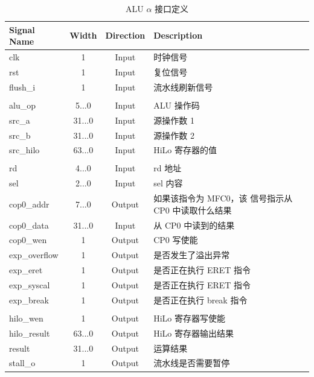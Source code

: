 \documentclass[blue,normal,cn,hide]{elegantbook}
\begin{document}
\begin{table}
    \renewcommand\arraystretch{1.25}
    \centering
    \begin{tabular}{lccm{}}
        \toprule 
        \rowcolor{black!20} \textbf{Signal Name} & \textbf{Width} & \textbf{Direction} & \textbf{Description} \\
        \midrule
        clk & 1 & Input & 时钟信号\\
        rst & 1 & Input & 复位信号\\
        flush\_i & 1 &Input & 流水线刷新信号\\
        \\
        alu\_op & 5...0 & Input & ALU 操作码\\
        src\_a & 31...0 & Input & 源操作数 1\\
        src\_b & 31...0 & Input & 源操作数 2\\
        src\_hilo & 63...0 & Input & HiLo 寄存器的值\\
        \\
        rd & 4...0 & Input & rd 地址\\
        sel & 2...0 & Input & sel 内容\\
        cop0\_addr & 7...0 & Output & 如果该指令为 MFC0，该
        信号指示从 CP0 中读取什么结果\\
        cop0\_data & 31...0 & Input & 从 CP0 中读到的结果\\
        cop0\_wen & 1 & Output & CP0 写使能\\
        exp\_overflow & 1 & Output & 是否发生了溢出异常\\
        exp\_eret & 1 & Output & 是否正在执行 ERET 指令\\
        exp\_syscal & 1 & Output & 是否正在执行 ERET 指令\\
        exp\_break & 1 & Output & 是否正在执行 break 指令\\
        \\
        hilo\_wen & 1 & Output & HiLo 寄存器写使能\\
        hilo\_result & 63...0 & Output & HiLo 寄存器输出结果\\
        result & 31...0 & Output & 运算结果\\
        stall\_o & 1 & Output & 流水线是否需要暂停\\
        \bottomrule
    \end{tabular}
    \caption{ALU $\alpha$ 接口定义}
    \label{tab:ALUAlphaInterface}
\end{table}
\end{document}
